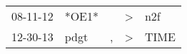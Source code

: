 \begin{supertabular}{p{0.07\textwidth}p{0.06\textwidth}p{0.02\textwidth}p{0.02\textwidth}p{0.06\textwidth}}
 08-11-12\textsuperscript{} &                   *OE1* &    &  \textgreater &   n2f\textsuperscript{} \\
 12-30-13\textsuperscript{} &  pdgt\textsuperscript{} &  , &  \textgreater &  TIME\textsuperscript{} \\
\end{supertabular}
